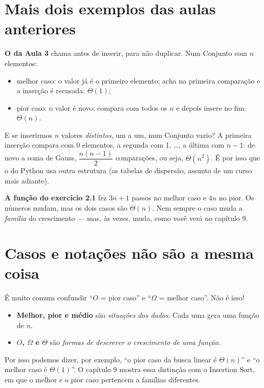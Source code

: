\section{Mais dois exemplos das aulas anteriores}

\textbf{O  da Aula 3} chama  antes de inserir, para
não duplicar. Num Conjunto com $n$ elementos:
\begin{itemize}
  \item melhor caso: o valor já é o primeiro elemento;  acha na primeira
        comparação e a inserção é recusada: $\Theta(1)$;
  \item pior caso: o valor é novo;  compara com todos os $n$ e depois
        insere no fim: $\Theta(n)$.
\end{itemize}
E se inserirmos $n$ valores \emph{distintos}, um a um, num Conjunto vazio? A primeira inserção
compara com 0 elementos, a segunda com 1, \dots, a última com $n - 1$: de novo a soma de Gauss,
$\dfrac{n(n-1)}{2}$ comparações, ou seja, $\Theta(n^2)$. É por isso que o  do
Python usa outra estrutura (as tabelas de dispersão, assunto de um curso mais adiante).

\textbf{A função  do exercício 2.1} fez $3n + 1$ passos no melhor caso e $4n$ no
pior. Os números mudam, mas os dois casos são $\Theta(n)$. Nem sempre o caso muda a
\emph{família} do crescimento — mas, às vezes, muda, como você verá no capítulo 9.

\section{Casos e notações não são a mesma coisa}

\begin{atencao}
É muito comum confundir \enquote{$O$ = pior caso} e \enquote{$\Omega$ = melhor caso}. Não é isso!
\begin{itemize}
  \item \textbf{Melhor, pior e médio} são \emph{situações dos dados}. Cada uma gera uma função de $n$.
  \item \textbf{$O$, $\Omega$ e $\Theta$} são \emph{formas de descrever o crescimento de uma função}.
\end{itemize}
Por isso podemos dizer, por exemplo, \enquote{o pior caso da busca linear é $\Theta(n)$} e
\enquote{o melhor caso é $\Theta(1)$}. O capítulo 9 mostra essa distinção com o Insertion Sort,
em que o melhor e o pior caso pertencem a famílias diferentes.
\end{atencao}

